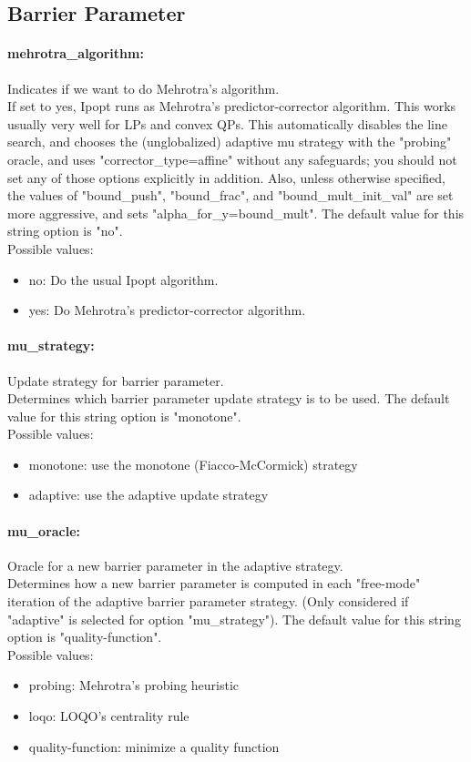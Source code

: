 \subsection{Barrier Parameter}

\paragraph{mehrotra\_algorithm:}\label{opt:mehrotra_algorithm} Indicates if we want to do Mehrotra's algorithm. \\
 If set to yes, Ipopt runs as Mehrotra's
predictor-corrector algorithm. This works usually
very well for LPs and convex QPs.  This
automatically disables the line search, and
chooses the (unglobalized) adaptive mu strategy
with the "probing" oracle, and uses
"corrector\_type=affine" without any safeguards;
you should not set any of those options
explicitly in addition.  Also, unless otherwise
specified, the values of "bound\_push",
"bound\_frac", and "bound\_mult\_init\_val" are
set more aggressive, and sets
"alpha\_for\_y=bound\_mult". The default value for this string option is "no".
\\ 
Possible values:
\begin{itemize}
   \item no: Do the usual Ipopt algorithm.
   \item yes: Do Mehrotra's predictor-corrector algorithm.
\end{itemize}

\paragraph{mu\_strategy:}\label{opt:mu_strategy} Update strategy for barrier parameter. \\
 Determines which barrier parameter update
strategy is to be used. The default value for this string option is "monotone".
\\ 
Possible values:
\begin{itemize}
   \item monotone: use the monotone (Fiacco-McCormick) strategy
   \item adaptive: use the adaptive update strategy
\end{itemize}

\paragraph{mu\_oracle:}\label{opt:mu_oracle} Oracle for a new barrier parameter in the adaptive strategy. \\
 Determines how a new barrier parameter is
computed in each "free-mode" iteration of the
adaptive barrier parameter strategy. (Only
considered if "adaptive" is selected for option
"mu\_strategy"). The default value for this string option is "quality-function".
\\ 
Possible values:
\begin{itemize}
   \item probing: Mehrotra's probing heuristic
   \item loqo: LOQO's centrality rule
   \item quality-function: minimize a quality function
\end{itemize}

